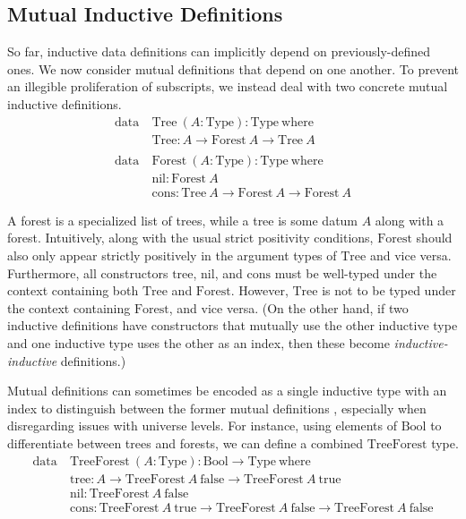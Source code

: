 \documentclass{report}
\newcommand{\nil}{\const{nil}}
\newcommand{\cons}{\const{cons}}
\newcommand{\Tree}{\const{Tree}}
\newcommand{\Forest}{\const{Forest}}
\newcommand{\TreeForest}{\const{TreeForest}}
\newcommand{\tree}{\const{tree}}
\newcommand{\true}{\const{true}}
\newcommand{\false}{\const{false}}
\newcommand{\const}[1]{\text{#1}}
\newcommand{\data}{\const{data}}
\newcommand{\Type}{\const{Type}}
\newcommand{\where}{\const{where}}
\begin{document}
\subsection{Mutual Inductive Definitions}

So far, inductive data definitions can implicitly depend on previously-defined ones. We now consider mutual definitions that depend on one another. To prevent an illegible proliferation of subscripts, we instead deal with two concrete mutual inductive definitions.
%
\begin{align*}
    \data ~ &\Tree ~ (A: \Type) : \Type ~ \where \\
    &\Tree: A \to \Forest ~ A \to \Tree ~ A \\
    \\
    \data ~ &\Forest ~ (A: \Type): \Type ~ \where \\
    &\nil: \Forest ~ A \\
    &\cons: \Tree ~ A \to \Forest ~ A \to \Forest ~ A
\end{align*}

A forest is a specialized list of trees, while a tree is some datum $A$ along with a forest. Intuitively, along with the usual strict positivity conditions, $\Forest$ should also only appear strictly positively in the argument types of $\Tree$ and vice versa. Furthermore, all constructors $\tree$, $\nil$, and $\cons$ must be well-typed under the context containing both $\Tree$ and $\Forest$. However, $\Tree$ is not to be typed under the context containing $\Forest$, and vice versa. (On the other hand, if two inductive definitions have constructors that mutually use the other inductive type and one inductive type uses the other as an index, then these become \emph{inductive-inductive} definitions.)

Mutual definitions can sometimes be encoded as a single inductive type with an index to distinguish between the former mutual definitions \citep{rooster}, especially when disregarding issues with universe levels. For instance, using elements of $\const{Bool}$ to differentiate between trees and forests, we can define a combined $\TreeForest$ type.
%
\begin{align*}
    \data ~ &\TreeForest ~ (A: \Type) : \const{Bool} \to \Type ~ \where \\
    &\tree: A \to \TreeForest ~ A ~ \false \to \TreeForest ~ A ~ \true \\
    &\nil: \TreeForest ~ A ~ \false \\
    &\cons: \TreeForest ~ A ~ \true \to \TreeForest ~ A ~ \false \to \TreeForest ~ A ~ \false
\end{align*}
\end{document}
